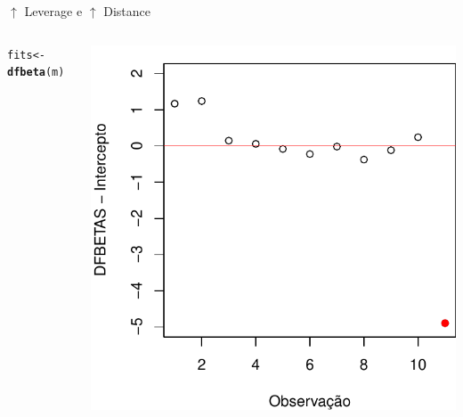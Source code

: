 \documentclass{beamer}\usepackage[]{graphicx}\usepackage[]{color}
\makeatletter
\newcommand{\hlstd}[1]{\textcolor[rgb]{0.345,0.345,0.345}{#1}}%
\newcommand{\hlkwb}[1]{\textcolor[rgb]{0.69,0.353,0.396}{#1}}%
\newcommand{\hlkwd}[1]{\textcolor[rgb]{0.737,0.353,0.396}{\textbf{#1}}}%
\newenvironment{kframe}{%
 \def\at@end@of@kframe{}%
 \ifinner\ifhmode%
  \def\at@end@of@kframe{\end{minipage}}%
  \begin{minipage}{\columnwidth}%
 \fi\fi%
 \def\FrameCommand##1{\hskip\@totalleftmargin \hskip-\fboxsep
 \colorbox{shadecolor}{##1}\hskip-\fboxsep
     \hskip-\linewidth \hskip-\@totalleftmargin \hskip\columnwidth}%
 \MakeFramed {\advance\hsize-\width
   \@totalleftmargin\z@ \linewidth\hsize
   \@setminipage}}%
 {\par\unskip\endMakeFramed%
 \at@end@of@kframe}
\newenvironment{knitrout}{}{} %
\renewenvironment{knitrout}{\setlength{\topsep}{0mm}}{}
\makeatother
\begin{document}
\begin{frame}{$\uparrow$ Leverage e $\uparrow$ Distance}
\begin{columns}[c]
\begin{knitrout}\tiny
{}\color{fgcolor}\begin{kframe}
\begin{alltt}
\hlstd{fits} \hlkwb{<-} \hlkwd{dfbeta}\hlstd{(m)}
\end{alltt}
\end{kframe}
\includegraphics[width=1\linewidth]{figure/inf6-1} 

\end{knitrout}
\end{columns}
\end{frame}
\end{document}
